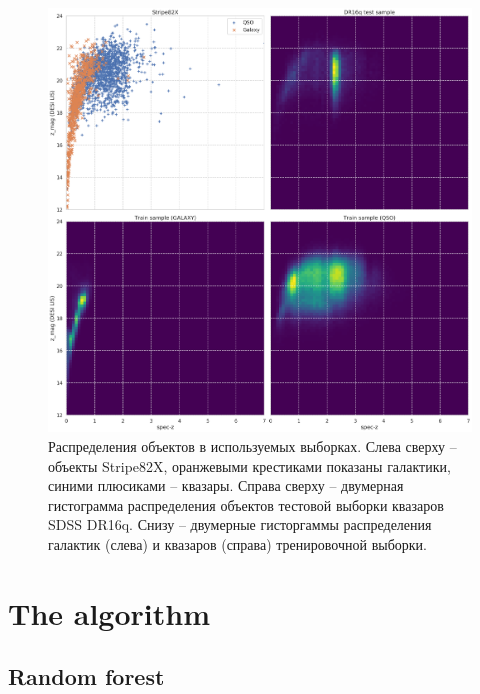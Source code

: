 \documentclass[fleqn,usenatbib]{mnras}
\begin{document}
\begin{figure}
    \centering
    \includegraphics[width=0.95\linewidth]{images/data-dist.png}
    \caption{Распределения объектов в используемых выборках. Слева сверху -- объекты Stripe82X, оранжевыми крестиками показаны галактики, синими плюсиками -- квазары. Справа сверху -- двумерная гистограмма распределения объектов тестовой выборки квазаров SDSS DR16q. Снизу -- двумерные гисторгаммы распределения галактик (слева) и квазаров (справа) тренировочной выборки.}
    \label{fig:data_distribution}
\end{figure}


\section{The algorithm}
\subsection{Random forest}
\end{document}

